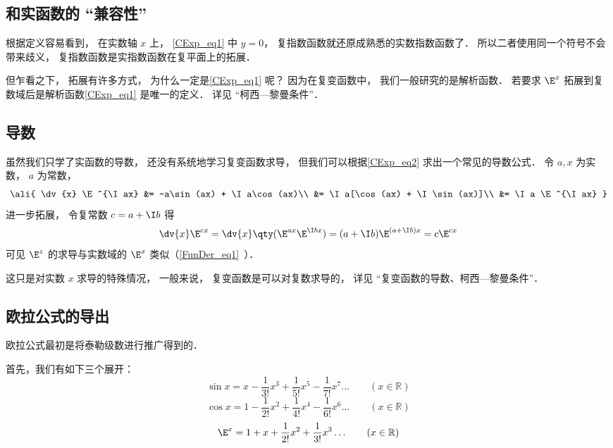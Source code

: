 \subsection{和实函数的 “兼容性”}
根据定义容易看到， 在实数轴 $x$ 上， \autoref{CExp_eq1} 中 $y = 0$， 复指数函数就还原成熟悉的实数指数函数了． 所以二者使用同一个符号不会带来歧义， 复指数函数是实指数函数在复平面上的拓展．

但乍看之下， 拓展有许多方式， 为什么一定是\autoref{CExp_eq1} 呢？ 因为在复变函数中， 我们一般研究的是解析函数． 若要求 $\E^x$ 拓展到复数域后是解析函数\autoref{CExp_eq1} 是唯一的定义． 详见 “柯西—黎曼条件”．

\subsection{导数}
虽然我们只学了实函数的导数， 还没有系统地学习复变函数求导， 但我们可以根据\autoref{CExp_eq2} 求出一个常见的导数公式． 令 $a, x$ 为实数， $a$ 为常数，
\begin{equation}\ali{
\dv{x} \E^{\I ax} &= -a\sin(ax) + \I a\cos(ax)\\
&= \I a[\cos(ax) + \I \sin(ax)]\\
&= \I a \E^{\I ax}
}\end{equation}
进一步拓展， 令复常数 $c = a + \I b$ 得
\begin{equation}
\dv{x}\E^{c x} = \dv{x} \qty(\E^{ax}\E^{\I bx}) = (a + \I b)\E^{(a+\I b)x} = c\E^{cx}
\end{equation}
可见 $\E^z$ 的求导与实数域的 $\E^x$ 类似（\autoref{FunDer_eq1}~）．

这只是对实数 $x$ 求导的特殊情况， 一般来说， 复变函数是可以对复数求导的， 详见 “复变函数的导数、柯西—黎曼条件”．

\subsection{欧拉公式的导出}


欧拉公式最初是将泰勒级数进行推广得到的．

首先，我们有如下三个展开：
\begin{equation}\label{CExp_eq3}
\sin x = x - \frac{1}{3!} x^3 + \frac{1}{5!} x^5 - \frac{1}{7!} x^7 \ldots
\qquad (x \in \mathbb R)
\end{equation}
\begin{equation}\label{CExp_eq5}
\cos x = 1 - \frac{1}{2!} x^2 + \frac{1}{4!} x^4 -\frac{1}{6!} x^6 \ldots
\qquad (x \in \mathbb R)
\end{equation}
\begin{equation}
\E^x =1 + x + \frac{1}{2!} x^2 + \frac{1}{3!} x^3  \ldots
\qquad (x \in \mathbb R)
\end{equation}

